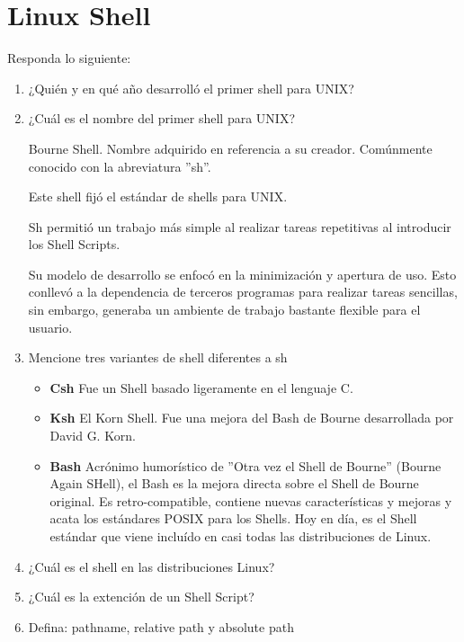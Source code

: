 \section{Linux Shell}

	Responda lo siguiente:

		\begin{enumerate}

			\item ¿Quién y en qué año desarrolló el primer shell para UNIX?
			
			\item ¿Cuál es el nombre del primer shell para UNIX?
			
			Bourne Shell. Nombre adquirido en referencia a su creador. Comúnmente conocido con la abreviatura ''sh''.
			
			Este shell fijó el estándar de shells para UNIX.
			
			Sh permitió un trabajo más simple al realizar tareas repetitivas al introducir los Shell Scripts.
			
			Su modelo de desarrollo se enfocó en la minimización y apertura de uso. Esto conllevó a la dependencia de terceros programas para realizar tareas sencillas, sin embargo, generaba un ambiente de trabajo bastante flexible para el usuario.
			
			\item Mencione tres variantes de shell diferentes a sh
			\begin{itemize}
				\item \textbf{Csh} \newline
				Fue un Shell basado ligeramente en el lenguaje C.
				\item \textbf{Ksh} \newline
				El Korn Shell. Fue una mejora del Bash de Bourne desarrollada por David G. Korn.
				\item \textbf{Bash} \newline
				Acrónimo humorístico de ''Otra vez el Shell de Bourne'' (Bourne Again SHell), el Bash es la mejora directa sobre el Shell de Bourne original. Es retro-compatible, contiene nuevas características y mejoras y acata los estándares POSIX para los Shells.
				Hoy en día, es el Shell estándar que viene incluído en casi todas las distribuciones de Linux.
			\end{itemize}
			
			\item ¿Cuál es el shell en las distribuciones Linux?
			
			\item ¿Cuál es la extención de un Shell Script?
			
			\item Defina: pathname, relative path y absolute path
			
		\end{enumerate}

